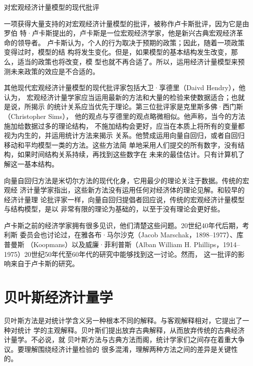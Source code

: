 \begin{mybox}{对宏观经济计量模型的现代批评}
  \begin{multicols}{2}

    一项获得大量支持的对宏观经济计量模型的批评，被称作卢卡斯批评，因为它是由罗伯
    特·卢卡斯提出的，卢卡斯是一位宏观经济学家，他是新兴古典宏观经济革命的领导者。
    卢卡斯认为，个人的行为取决于预期的政策；因此，随着一项政策变得过时，模型的结
    构将发生变化。但是，如果模型的基本结构发生改变，那么，适当的政策也将改变，模
    型也就不再合适了。所以，运用经济计量模型来预测未来政策的效应是不合适的。

    其他现代宏观经济计量模型的现代批评家包括大卫·享德里（Daivd Hendry），他认为，
    宏观经济计量学家应当运用最新的方法和大量的检验来使数据适合；也就是说，所揭示
    的统计关系应当优先于理论。第三位批评家是克里斯多佛·西门斯（Christopher Sims），
    他的观点与亨德里的观点略微相似。他声称，当今的方法施加给数据过多的理论结构，
    不施加结构会更好，应当在本质上将所有的变量都视为内生的，并运用统计方法来揭示
    关系。他赞成运用向量自回归，或者自回归移动和平均模型一类的方法。这些方法简
    单地采用人们提交的所有数字，没有结构，如果时间结构关系持续，再找到这些数字在
    未来的最佳估计。只有计算机了解这一基本结构。

    向量自回归方法是米切尔方法的现代化身，它用最少的理论关注于数据。传统的宏观经
    济计量学家指出，这些新方法没有运用任何对经济体的理论见解。和较早的经济计量理
    论批评家一样，向量自回归提倡者回应说，传统的宏观经济计量模型与结构模型，是以
    非常有限的理论为基础的，以至于没有理论会更好些。


    卢卡斯之前的经济学家拥有很多见识，他们清楚这些问题。20世纪40年代后期，考利斯
    委员会也讨论过，在雅各布·马尔沙克（Jacob Marschak，1898--1977）、库普曼斯
    （Koopmans）以及威廉·菲利普斯（Alban William
    H. Phillips，1914--1975）20世纪50年代至60年代的研究中能够找到这一讨论。然而，
    这一批评的影响来自于卢卡斯的研究。
  \end{multicols}
\end{mybox}

\section{贝叶斯经济计量学}

贝叶斯方法是对统计学含义另一种根本不同的解释。与客观解释相对，它提出了一种对统计
学的主观解释。贝叶斯们提出放弃古典解释，从而放弃传统的古典经济计量学。不必说，就
贝叶斯方法与古典方法而阁，统计学家们之间存在着重大争议。要理解围绕经济计量检验的
很多混淆，理解两种方法之间的差异是关键性的。

